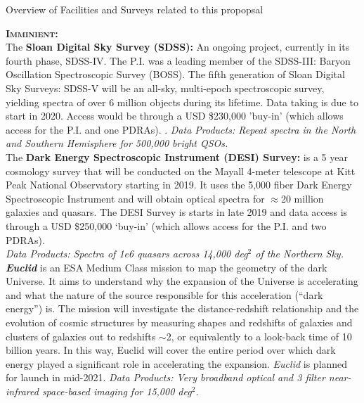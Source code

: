 \begin{framed}
\begin{tcolorbox}
\begin{center} 
  Overview of Facilities and Surveys related to this propopsal
\end{center}
\end{tcolorbox}

\noindent
\textbf{\textsc{Imminient:}}\\

The {\bf Sloan Digital Sky Survey (SDSS):} An ongoing project, currently in its fourth phase, SDSS-IV.  
The P.I. was a leading member of the SDSS-III: Baryon Oscillation Spectroscopic Survey (BOSS). 
The fifth generation of Sloan Digital Sky Surveys: SDSS-V will be an all-sky, multi-epoch spectroscopic 
survey, yielding spectra of over 6 million objects during its lifetime. Data taking is due to start in 
2020. Access would be through a USD \$230,000 'buy-in' (which allows access for the P.I. and one PDRAs).  . 
{\it Data Products: Repeat spectra in the North and Southern Hemisphere for 500,000 bright QSOs.} \\

The {\bf Dark Energy Spectroscopic Instrument (DESI) Survey:} is a 5 year cosmology survey 
that will be conducted on the Mayall 4-meter telescope at Kitt Peak National Observatory starting 
in 2019. It uses the 5,000 fiber Dark Energy Spectroscopic Instrument and will obtain optical 
spectra for $\approx$20 million galaxies and quasars. The DESI Survey is starts in late 2019 
and data access is through a USD \$250,000 `buy-in' (which allows access for the P.I. and two PDRAs).  \\
{\it Data Products: Spectra of 1e6 quasars across 14,000 deg$^{2}$ of the Northern Sky.} \\

\textit{\textbf{Euclid}} is an ESA Medium Class mission to map the geometry of the dark Universe.
It aims to understand why the expansion of the Universe is accelerating and what the nature 
of the source responsible for this acceleration (``dark energy'') is. 
The
mission will investigate the distance-redshift relationship and the
evolution of cosmic structures by measuring shapes and redshifts of
galaxies and clusters of galaxies out to redshifts $\sim$2, or equivalently
to a look-back time of 10 billion years. In this way, Euclid will
cover the entire period over which dark energy played a significant
role in accelerating the expansion.
{\it Euclid} is planned for launch in mid-2021. 
{\it Data Products: Very broadband optical and 3 filter near-infrared space-based imaging for 15,000 deg$^2$.} \\


\end{framed}

